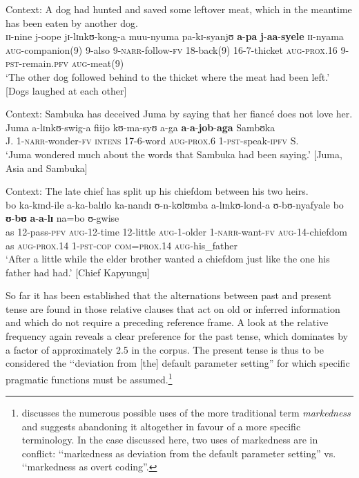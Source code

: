 \begin{exe}
\ex \label{exRelPSTinPSTinchoative}
Context: A dog had hunted and saved some leftover meat, which in the meantime has been eaten by another dog.\\
\gll ɪɪ-nine j-oope jɪ-lɪnkʊ-kong-a muu-nyuma pa-kɪ-syanjʊ \textbf{a}-\textbf{pa} \textbf{j}-\textbf{aa}-\textbf{syele} ɪɪ-nyama\\
\textsc{aug}-companion(9) 9-also 9-\textsc{narr}-follow-\textsc{fv} 18-back(9) 16-7-thicket \textsc{aug}-\textsc{prox.16} 9-\textsc{pst}-remain.\textsc{pfv} \textsc{aug}-meat(9)\\
\glt \lq The other dog followed behind to the thicket where the meat had been left.' [Dogs laughed at each other] 

\ex \label{exRelPSTinPSTipfv}
Context: Sambuka has deceived Juma by saying that her fiancé does not love her.\\
\gll Juma a-lɪnkʊ-swig-a fiijo kʊ-ma-syʊ a-ga \textbf{a}-\textbf{a}-\textbf{job}-\textbf{aga} Sambʊka\\
J. 1-\textsc{narr}-wonder-\textsc{fv} \textsc{intens} 17-6-word \textsc{aug}-\textsc{prox.6} 1-\textsc{pst}-speak-\textsc{ipfv} S.\\
\glt \lq Juma wondered much about the words that Sambuka had been saying.' [Juma, Asia and Sambuka]

\ex \label{exRelPSTinPSTCop}
Context: The late chief has split up his chiefdom between his two heirs.\\
\gll bo ka-kɪnd-ile a-ka-balɪlo ka-nandɪ ʊ-n-kʊlʊmba a-lɪnkʊ-lond-a ʊ-bʊ-nyafyale bo \textbf{ʊ}-\textbf{bʊ} \textbf{a}-\textbf{a}-\textbf{lɪ} na=bo ʊ-gwise\\
as 12-pass-\textsc{pfv} \textsc{aug}-12-time 12-little \textsc{aug}-1-older 1-\textsc{narr}-want-\textsc{fv} \textsc{aug}-14-chiefdom as \textsc{aug}-\textsc{prox.14} 1-\textsc{pst}-\textsc{cop} \textsc{com}=\textsc{prox.14} \textsc{aug}-his\_father\\
\glt \lq After a little while the elder brother wanted a chiefdom just like the one his father had had.' [Chief Kapyungu] %
\end{exe}

So far it has been established that the alternations between past and present tense are found in those relative clauses that act on old or inferred information and which do not require a preceding reference frame. A look at the relative frequency again reveals a clear preference for the past tense, which dominates by a factor of approximately 2.5 in the corpus. The present tense is thus to be considered the \lq\lq deviation from [the] default parameter setting'' \citep[64f]{HaspelmathM2006} for which specific pragmatic functions must be assumed.\footnote{\citet{HaspelmathM2006} discusses the numerous possible uses of the more traditional term \textit{markedness} and suggests abandoning it altogether in favour of a more specific terminology. In the case discussed here, two uses of markedness are in conflict: \lq\lq markedness as deviation from the default parameter setting'' vs. \lq\lq markedness as overt coding''.}

